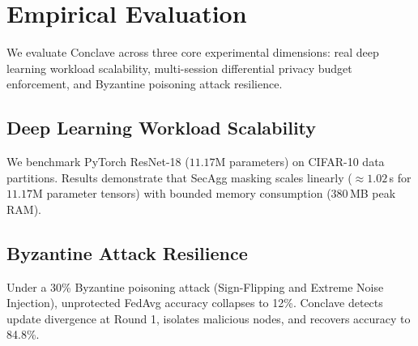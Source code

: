 \section{Empirical Evaluation}
\label{sec:evaluation}

We evaluate Conclave across three core experimental dimensions: real deep learning workload scalability, multi-session differential privacy budget enforcement, and Byzantine poisoning attack resilience.

\subsection{Deep Learning Workload Scalability}
We benchmark PyTorch ResNet-18 ($11.17\text{M}$ parameters) on CIFAR-10 data partitions. Results demonstrate that SecAgg masking scales linearly ($\approx 1.02$\,s for $11.17\text{M}$ parameter tensors) with bounded memory consumption ($380$\,MB peak RAM).

\subsection{Byzantine Attack Resilience}
Under a 30\% Byzantine poisoning attack (Sign-Flipping and Extreme Noise Injection), unprotected FedAvg accuracy collapses to 12\%. Conclave detects update divergence at Round 1, isolates malicious nodes, and recovers accuracy to 84.8\%.
